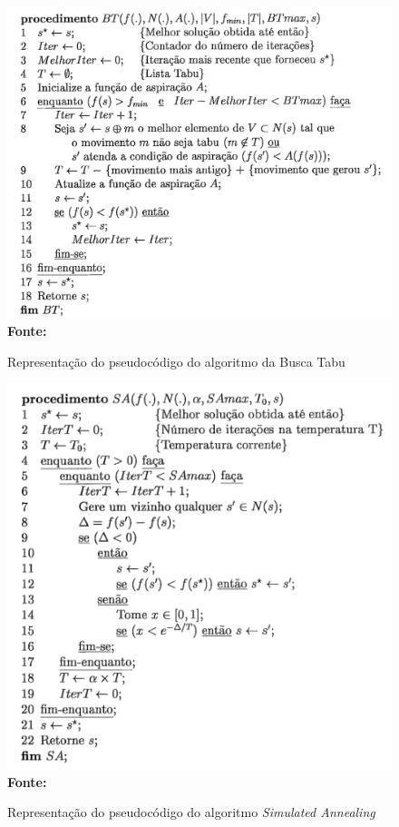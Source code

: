 \usepackage[titletoc,toc,page]{appendix}

\renewcommand{\appendixtocname}{Ap\'endices}

\renewcommand{\appendixpagename}{Ap\'endices}

\begin{figure}[!htb]
\caption[Representação do pseudocódigo do algoritmo da Busca Tabu]{Representação do pseudocódigo do algoritmo da Busca Tabu}
\label{fig:buscaTabu}
\centering
\includegraphics[scale=0.50]{imagens/representacaoBuscaTabu.png}
\\ \textbf{\footnotesize Fonte: \cite{souza2000}}
\end{figure}

\begin{figure}[!htb]
\caption[Representação do pseudocódigo do algoritmo \textit{Simulated Annealing}]{Representação do pseudocódigo do algoritmo \textit{Simulated Annealing}}
\label{fig:resozimentoSimulado}
\centering
\includegraphics[scale=0.55]{imagens/representacaoSimulatedAnnealing.png}
\\ \textbf{\footnotesize Fonte: \cite{souza2002experiencias}}
\end{figure}